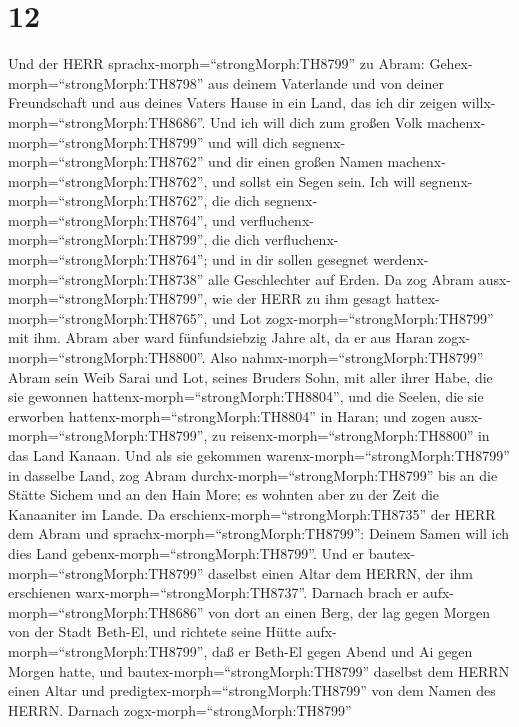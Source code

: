 \hypertarget{section-11}{%
\section{12}\label{section-11}}

 Und der HERR sprachx-morph=``strongMorph:TH8799'' zu Abram:
Gehex-morph=``strongMorph:TH8798'' aus deinem Vaterlande und von deiner
Freundschaft und aus deines Vaters Hause in ein Land, das ich dir zeigen
willx-morph=``strongMorph:TH8686''.  Und ich will dich zum
großen Volk machenx-morph=``strongMorph:TH8799'' und will dich
segnenx-morph=``strongMorph:TH8762'' und dir einen großen Namen
machenx-morph=``strongMorph:TH8762'', und sollst ein Segen sein.
 Ich will segnenx-morph=``strongMorph:TH8762'', die dich
segnenx-morph=``strongMorph:TH8764'', und
verfluchenx-morph=``strongMorph:TH8799'', die dich
verfluchenx-morph=``strongMorph:TH8764''; und in dir sollen gesegnet
werdenx-morph=``strongMorph:TH8738'' alle Geschlechter auf Erden.
 Da zog Abram ausx-morph=``strongMorph:TH8799'', wie der
HERR zu ihm gesagt hattex-morph=``strongMorph:TH8765'', und Lot
zogx-morph=``strongMorph:TH8799'' mit ihm. Abram aber ward
fünfundsiebzig Jahre alt, da er aus Haran
zogx-morph=``strongMorph:TH8800''.  Also
nahmx-morph=``strongMorph:TH8799'' Abram sein Weib Sarai und Lot, seines
Bruders Sohn, mit aller ihrer Habe, die sie gewonnen
hattenx-morph=``strongMorph:TH8804'', und die Seelen, die sie erworben
hattenx-morph=``strongMorph:TH8804'' in Haran; und zogen
ausx-morph=``strongMorph:TH8799'', zu
reisenx-morph=``strongMorph:TH8800'' in das Land Kanaan. Und als sie
gekommen warenx-morph=``strongMorph:TH8799'' in dasselbe Land,
 zog Abram durchx-morph=``strongMorph:TH8799'' bis an die
Stätte Sichem und an den Hain More; es wohnten aber zu der Zeit die
Kanaaniter im Lande.  Da
erschienx-morph=``strongMorph:TH8735'' der HERR dem Abram und
sprachx-morph=``strongMorph:TH8799'': Deinem Samen will ich dies Land
gebenx-morph=``strongMorph:TH8799''. Und er
bautex-morph=``strongMorph:TH8799'' daselbst einen Altar dem HERRN, der
ihm erschienen warx-morph=``strongMorph:TH8737''.  Darnach
brach er aufx-morph=``strongMorph:TH8686'' von dort an einen Berg, der
lag gegen Morgen von der Stadt Beth-El, und richtete seine Hütte
aufx-morph=``strongMorph:TH8799'', daß er Beth-El gegen Abend und Ai
gegen Morgen hatte, und bautex-morph=``strongMorph:TH8799'' daselbst dem
HERRN einen Altar und predigtex-morph=``strongMorph:TH8799'' von dem
Namen des HERRN.  Darnach zogx-morph=``strongMorph:TH8799''
